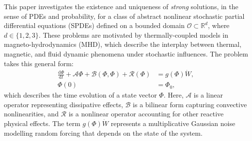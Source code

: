 \documentclass[11pt, reqno]{amsart}
\theoremstyle{definition}
\numberwithin{equation}{section}
\newcommand{\bb}{\mathbb}
\begin{document}
This paper investigates the existence and uniqueness of \emph{strong} solutions, in the sense of PDEs and probability, for a class of abstract nonlinear stochastic partial differential equations (SPDEs) defined on a bounded domain $\mathscr{O}\subset \bb{R}^d$, where $d\in \{1,2,3\}$. These problems are motivated by thermally-coupled models in magneto-hydrodynamics {(MHD)}, which describe the interplay between thermal, magnetic, and fluid dynamic phenomena under stochastic influences. The problem takes this general form:
\begin{equation}\label{equ:equation}
	\begin{aligned}
	\frac{\mathrm{d} \Phi}{\mathrm{d}t}+ \mathcal{A} \Phi + \mathcal{B}(\Phi,\Phi) + \mathcal{R}(\Phi)
	&=
	g(\Phi) \dot{W},
	\\
	\Phi(0) &= \Phi_0,
	\end{aligned}
\end{equation}
which describes the time evolution of a state vector $\Phi$. Here, $\mathcal{A}$ is a linear operator representing dissipative effects, $\mathcal{B}$ is a bilinear form capturing convective nonlinearities, and $\mathcal{R}$ is a nonlinear operator accounting for other reactive physical effects. The term $g(\Phi) \dot{W}$ represents a multiplicative Gaussian noise modelling random forcing that depends on the state of the system. 
\end{document}
